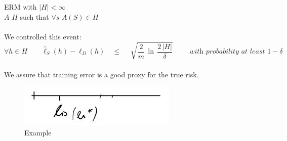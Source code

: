 \documentclass[../main.tex]{subfiles}
\begin{document}
ERM with $|H| < \infty$
\\
$A$ \qquad $H$ such that $\forall s$ $A(S) \in H$
\\\\
We controlled this event:
$$
\forall h \in H \qquad \hat{\ell}_S(h) - \ell_D \left(h\right) \quad \leq \quad \sqrt[]{\frac{2}{m}\, \ln \, \frac{2\,|H|}{\delta}} 
\qquad 
\textit{ with probability at least $1-\delta$}
$$\\
We assure that training error is a good proxy for the true risk.
\begin{figure}[h]
    \centering
    \includegraphics[width=0.5\linewidth]{../img/lez8-img2.JPG}
    \caption{Example}
\end{figure}\\
\\
\end{document}
